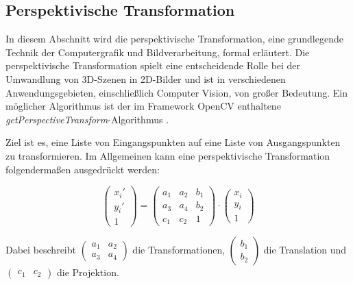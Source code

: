 \documentclass[
  ngerman,
  a4paper,  %
  twoside,  %
  bibliography=totoc,
  headsepline,
  cleardoublepage=empty,
  parskip=half,
  draft=false
]{scrbook}
\begin{document}
\subsection{Perspektivische Transformation}
In diesem Abschnitt wird die perspektivische Transformation, eine grundlegende Technik der Computergrafik und Bildverarbeitung, formal erläutert. Die perspektivische Transformation spielt eine entscheidende Rolle bei der Umwandlung von 3D-Szenen in 2D-Bilder und ist in verschiedenen Anwendungsgebieten, einschließlich Computer Vision, von großer Bedeutung. Ein möglicher Algorithmus ist der im Framework OpenCV enthaltene \textit{getPerspectiveTransform}-Algorithmus \cite{src_persp_trans}.

Ziel ist es, eine Liste von Eingangspunkten auf eine Liste von Ausgangspunkten zu transformieren. Im Allgemeinen kann eine perspektivische Transformation folgendermaßen ausgedrückt werden:

\begin{equation}
  \begin{pmatrix} x_i'\\ y_i'\\ 1\end{pmatrix}=\begin{pmatrix}
    a_1 & a_2 & b_1 \\
    a_3 & a_4 & b_2 \\
    c_1 & c_2 & 1
  \end{pmatrix}\cdot\begin{pmatrix}
    x_i \\y_i\\1
  \end{pmatrix}
\end{equation}

Dabei beschreibt $\begin{pmatrix}
    a_1 & a_2 \\
    a_3 & a_4
  \end{pmatrix}$ die Transformationen, $\begin{pmatrix}
    b_1 \\
    b_2
  \end{pmatrix}$ die Translation und $\begin{pmatrix}
    c_1 & c_2
  \end{pmatrix}$ die Projektion.
\end{document}
